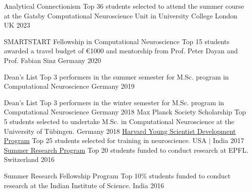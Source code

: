 \begin{cvhonors}
    \cvhonor
    {Analytical Connectionism} %
    {Top 36 students selected to attend the summer course at the Gatsby Computational Neuroscience Unit in University College London} %
    {UK} %
    {2023} %

    
    \cvhonor
    {SMARTSTART Fellowship in Computational Neuroscience} %
    {Top 15 students awarded a travel budget of \euro{1000} and mentorship from Prof. Peter Dayan and Prof. Fabian Sinz} %
    {Germany} %
    {2020} %
    
  \cvhonor
    {Dean's List} %
    {Top 3 performers in the summer semester for M.Sc. program in Computational Neuroscience} %
    {Germany} %
    {2019} %

  \cvhonor
    {Dean's List} %
    {Top 3 performers in the winter semester for M.Sc. program in Computational Neuroscience} %
    {Germany} %
    {2018} %
    \cvhonor
    {Max Planck Society Scholarship} %
    {Top 5 students selected to undertake M.Sc. in Computational Neuroscience at the University of Tübingen.} %
    {Germany} %
    {2018} %
  \cvhonor
    {\href{https://mittalsouthasiainstitute.harvard.edu/2017/01/engineers-techies-delve-into-the-mysteries-of-brain/}{Harvard Young Scientist Development Program}} %
    {Top 25 students selected for training in neuroscience.} %
    {USA $\mid$ India} %
    {2017} %
  \cvhonor
    {\href{https://www.epfl.ch/schools/sv/education/summer-research-program/program-description/}{Summer Research Program}} %
    {Top 20 students funded to conduct research at EPFL.} %
    {Switzerland} %
    {2016} %

  \cvhonor
    {Summer Research Fellowship Program} %
    {Top 10\% students funded to conduct research at the Indian Institute of Science.} %
    {India} %
    {2016} %


\end{cvhonors}
